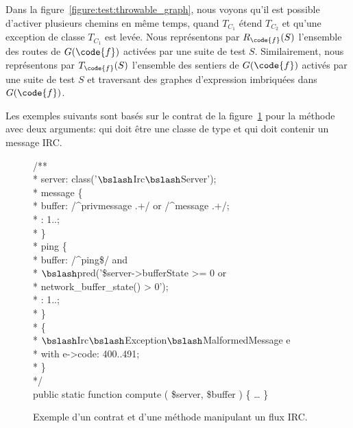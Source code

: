 \begin{example}

Dans la figure~\ref{figure:test:throwable_graph}, nous voyons qu'il est possible
d'activer plusieurs chemins en même temps, quand $T_{C_1}$ étend $T_{C_2}$ et
qu'une exception de classe $T_{C_1}$ est levée. Nous représentons par
$R_\code{f}(S)$ l'ensemble des routes de $G(\code{f})$ activées par une suite de
test $S$. Similairement, nous représentons par $T_\code{f}(S)$ l'ensemble des
sentiers de $G(\code{f})$ activés par une suite de test $S$ et traversant des
graphes d'expression imbriquées dans $G(\code{f})$.

\end{example}

Les exemples suivants sont basés sur le contrat de la
figure~\ref{figure:test:irc} pour la méthode  avec deux arguments:
 qui doit être une classe de type
 et  qui doit contenir un message
IRC.
%
\begin{figure}

\begin{bigpre}
/** \\
 * \arequires server: class('\(\bslash\)Irc\(\bslash\)Server'); \\
 * \abehavior message \{ \\
 *     \arequires buffer: /^privmessage .+/ or /^message .+/; \\
 *     \aensures  \aresult: 1..; \\
 * \} \\
 * \abehavior ping \{ \\
 *     \arequires buffer: /^ping\$/ and \\
 *               \(\bslash\)pred('\$server->bufferState   >= 0 or \\
 *                      network\_buffer\_state() >  0'); \\
 *     \aensures  \aresult: 1..; \\
 * \} \\
 * \adefault \{ \\
 *     \athrowable \(\bslash\)Irc\(\bslash\)Exception\(\bslash\)MalformedMessage e \\
 *                    with e->code: 400..491; \\
 * \} \\
 */ \\
public static function compute ( \$server, \$buffer ) \{ … \}
\end{bigpre}

\caption{\label{figure:test:irc} Exemple d'un contrat et d'une méthode
manipulant un flux IRC.}

\end{figure}
